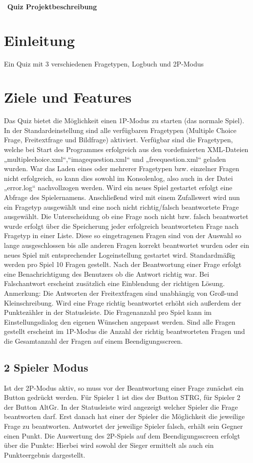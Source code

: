 \documentclass[10pt,a4paper,titlepage]{article}
\begin{document}
	\tableofcontents
	\ \\\\\\\
	\textbf{\large Quiz Projektbeschreibung}\\
	\section{Einleitung}
	Ein Quiz mit 3 verschiedenen Fragetypen, Logbuch und 2P-Modus
	\section{Ziele und Features}
	Das Quiz bietet die Möglichkeit einen 1P-Modus zu starten (das normale Spiel).
	In der Standardeinstellung sind alle verfügbaren Fragetypen (Multiple Choice Frage, Freitextfrage und Bildfrage) aktiviert.
	Verfügbar sind die Fragetypen, welche bei Start des Programmes erfolgreich aus den vordefinierten XML-Dateien „multiplechoice.xml“,“imagequestion.xml“ und „freequestion.xml“ geladen wurden.
	War das Laden eines oder mehrerer Fragetypen bzw. einzelner Fragen nicht erfolgreich, so kann dies sowohl im Konsolenlog, also auch in der Datei „error.log“ nachvollzogen werden.
	Wird ein neues Spiel gestartet erfolgt eine Abfrage des Spielernamens.
	Anschließend wird mit einem Zufallswert wird nun ein Fragetyp ausgewählt und eine noch nicht richtig/falsch beantwortete Frage ausgewählt.
	Die Unterscheidung ob eine Frage noch nicht bzw. falsch beantwortet wurde erfolgt über die Speicherung jeder erfolgreich beantworteten Frage nach Fragetyp in einer Liste.
	Diese so eingetragenen Fragen sind von der Auswahl so lange ausgeschlossen bis alle anderen Fragen korrekt beantwortet wurden oder ein neues Spiel mit entsprechender Logeinstellung gestartet wird.
	Standardmäßig werden pro Spiel 10 Fragen gestellt.
	Nach der Beantwortung einer Frage erfolgt eine Benachrichtigung des Benutzers ob die Antwort richtig war. Bei Falschantwort erscheint zusätzlich eine Einblendung der richtigen Lösung.
	Anmerkung: Die Antworten der Freitextfragen sind unabhängig von Groß-und Kleinschreibung.
	Wird eine Frage richtig beantwortet erhöht sich außerdem der Punktezähler in der Statusleiste.
	Die Fragenanzahl pro Spiel kann im Einstellungsdialog den eigenen Wünschen angepasst werden.
	Sind alle Fragen gestellt erscheint im 1P-Modus die Anzahl der richtig beantworteten Fragen und die Gesamtanzahl der Fragen auf einem Beendigungsscreen.
\subsection{2 Spieler Modus}
Ist der 2P-Modus aktiv, so muss vor der Beantwortung einer Frage zunächst ein Button gedrückt werden.
Für Spieler 1 ist dies der Button STRG, für Spieler 2 der Button AltGr.
In der Statusleiste wird angezeigt welcher Spieler die Frage beantworten darf.
Erst danach hat einer der Spieler die Möglichkeit die jeweilige Frage zu beantworten.
Antwortet der jeweilige Spieler falsch, erhält sein Gegner einen Punkt.
Die Auswertung des 2P-Spiels auf dem Beendigungsscreen erfolgt über die Punkte:
Hierbei wird sowohl der Sieger ermittelt als auch ein Punkteergebnis dargestellt.
\end{document}
